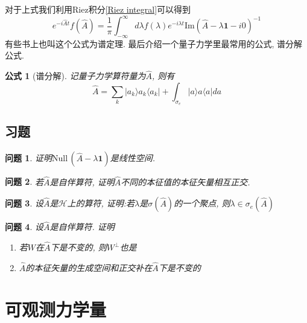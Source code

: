 \documentclass[a4paper,11pt]{book}
\newtheorem{problem}{问题}[section]
\newtheorem{formula}{公式}[section]
\newcommand{\A}{\hat{A}}
\begin{document}
对于上式我们利用Riez积分\eqref{Riez integral}可以得到
\begin{equation*}
  e^{-i\hat{A}t}f(\hat{A})=\frac{1}{\pi}\int_{-\infty}^{\infty}d\lambda f(\lambda)e^{-i\lambda t}\mathrm{Im}(\hat{A}-\lambda\mathbf{1}-i0)^{-1}
\end{equation*}
有些书上也叫这个公式为谱定理. 最后介绍一个量子力学里最常用的公式, 谱分解公式.
\begin{formula}[谱分解]
  记量子力学算符量为$\A$, 则有
  \begin{equation*}
    \A=\sum_{k}|a_k\rangle a_k\langle a_k|+\int_{\sigma_e}|a\rangle a\langle a| da
  \end{equation*}
\end{formula}
\subsection{习题}
\begin{problem}
  证明$\mathrm{Null}\,(\hat{A}-\lambda\mathbf{1})$是线性空间.
\end{problem}
\begin{problem}
  若$\hat{A}$是自伴算符, 证明$\hat{A}$不同的本征值的本征矢量相互正交.
\end{problem}
\begin{problem}
  设$\hat{A}$是$\mathcal{H}$上的算符, 证明:若$\lambda$是$\sigma(\hat{A})$的一个聚点, 则$\lambda\in\sigma_e(\hat{A})$
\end{problem}
\begin{problem}
  设$\hat{A}$是自伴算符. 证明
  \begin{enumerate}[(1)]
    \item 若$W$在$\hat{A}$下是不变的, 则$W^{\perp}$也是
    \item $\hat{A}$的本征矢量的生成空间和正交补在$\hat{A}$下是不变的
  \end{enumerate}
\end{problem}
\section{可观测力学量}
\end{document}
